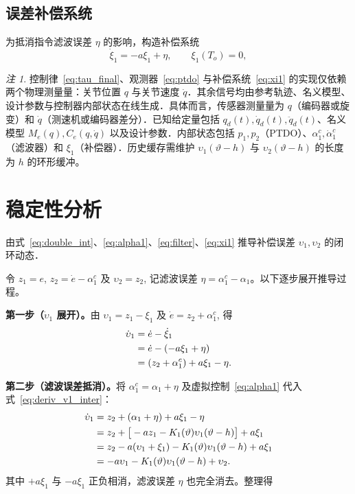 \documentclass[12pt,a4paper]{article}
\theoremstyle{definition}
\theoremstyle{remark}
\newtheorem{remark}{注}[section]
\newcommand{\vi}{\upsilon}
\newcommand{\vth}{\vartheta}
\begin{document}
\subsection{误差补偿系统}\label{sec:comp}

为抵消指令滤波误差 $\eta$ 的影响，构造补偿系统
\begin{equation}
  \dot\xi_1 = -a\xi_1+\eta,\qquad \xi_1(T_o)=0,\label{eq:xi1}
\end{equation}

\begin{remark}
  控制律~\eqref{eq:tau_final}、观测器~\eqref{eq:ptdo} 与补偿系统~\eqref{eq:xi1} 的实现仅依赖两个物理测量量：关节位置 $q$ 与关节速度 $\dot q$．其余信号均由参考轨迹、名义模型、设计参数与控制器内部状态在线生成．具体而言，传感器测量量为 $q$（编码器或旋变）和 $\dot q$（测速机或编码器差分）．已知给定量包括 $q_d(t),\dot q_d(t),\ddot q_d(t)$、名义模型 $M_e(q),C_e(q,\dot q)$ 以及设计参数．内部状态包括 $p_1,p_2$（PTDO）、$\alpha_1^c,\dot\alpha_1^c$（滤波器）和 $\xi_1$（补偿器）．历史缓存需维护 $\vi_1(\vth-h)$ 与 $\vi_2(\vth-h)$ 的长度为 $h$ 的环形缓冲。
\end{remark}

\section{稳定性分析}


由式~\eqref{eq:double_int}、\eqref{eq:alpha1}、\eqref{eq:filter}、\eqref{eq:xi1} 推导补偿误差 $\vi_1,\vi_2$ 的闭环动态．

令 $z_1=e$, $z_2=\dot e-\alpha_1^c$ 及 $\vi_2=z_2$, 记滤波误差 $\eta=\alpha_1^c-\alpha_1$。以下逐步展开推导过程。

\noindent\textbf{第一步（$\dot\vi_1$ 展开）。}由 $\vi_1=z_1-\xi_1$ 及 $\dot e=z_2+\alpha_1^c$, 得
\begin{align}
  \dot\vi_1 &= \dot e-\dot\xi_1 \notag\\
  &= \dot e-(-a\xi_1+\eta) \notag\\
  &= (z_2+\alpha_1^c)+a\xi_1-\eta . \label{eq:deriv_v1_inter}
\end{align}

\noindent\textbf{第二步（滤波误差抵消）。}将 $\alpha_1^c=\alpha_1+\eta$ 及虚拟控制~\eqref{eq:alpha1} 代入式~\eqref{eq:deriv_v1_inter}：
\begin{align}
  \dot\vi_1 &= z_2+(\alpha_1+\eta)+a\xi_1-\eta \notag\\
  &= z_2+\big[-a z_1-K_1(\vth)\vi_1(\vth-h)\big]+a\xi_1 \notag\\
  &= z_2-a(\vi_1+\xi_1)-K_1(\vth)\vi_1(\vth-h)+a\xi_1 \notag\\
  &= -a\vi_1-K_1(\vth)\vi_1(\vth-h)+\vi_2 .\label{eq:deriv_v1_final}
\end{align}
其中 $+a\xi_1$ 与 $-a\xi_1$ 正负相消，滤波误差 $\eta$ 也完全消去。整理得
\end{document}
